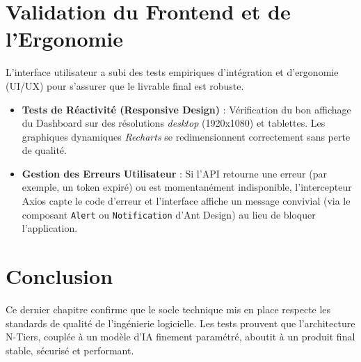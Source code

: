 \section{Validation du Frontend et de l'Ergonomie}
L'interface utilisateur a subi des tests empiriques d'intégration et d'ergonomie (UI/UX) pour s'assurer que le livrable final est robuste.
\begin{itemize}
    \item \textbf{Tests de Réactivité (Responsive Design)} : Vérification du bon affichage du Dashboard sur des résolutions \textit{desktop} (1920x1080) et tablettes. Les graphiques dynamiques \textit{Recharts} se redimensionnent correctement sans perte de qualité.
    \item \textbf{Gestion des Erreurs Utilisateur} : Si l'API retourne une erreur (par exemple, un token expiré) ou est momentanément indisponible, l'intercepteur Axios capte le code d'erreur et l'interface affiche un message convivial (via le composant \texttt{Alert} ou \texttt{Notification} d'Ant Design) au lieu de bloquer l'application.
\end{itemize}

\section*{Conclusion}
Ce dernier chapitre confirme que le socle technique mis en place respecte les standards de qualité de l'ingénierie logicielle. Les tests prouvent que l'architecture N-Tiers, couplée à un modèle d'IA finement paramétré, aboutit à un produit final stable, sécurisé et performant.
